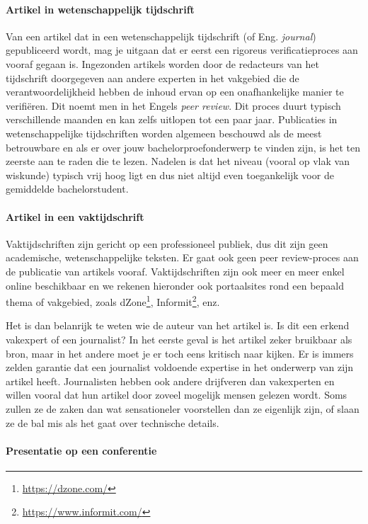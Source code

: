 \paragraph{Artikel in wetenschappelijk tijdschrift}

Van een artikel dat in een wetenschappelijk tijdschrift (of Eng. \emph{journal}) gepubliceerd wordt, mag je uitgaan dat er eerst een rigoreus verificatieproces aan vooraf gegaan is. Ingezonden artikels worden door de redacteurs van het tijdschrift doorgegeven aan andere experten in het vakgebied die de verantwoordelijkheid hebben de inhoud ervan op een onafhankelijke manier te verifiëren. Dit noemt men in het Engels \emph{peer review}. Dit proces duurt typisch verschillende maanden en kan zelfs uitlopen tot een paar jaar. Publicaties in wetenschappelijke tijdschriften worden algemeen beschouwd als de meest betrouwbare en als er over jouw bachelorproefonderwerp te vinden zijn, is het ten zeerste aan te raden die te lezen. Nadelen is dat het niveau (vooral op vlak van wiskunde) typisch vrij hoog ligt en dus niet altijd even toegankelijk voor de gemiddelde bachelorstudent.

\paragraph{Artikel in een vaktijdschrift}

Vaktijdschriften zijn gericht op een professioneel publiek, dus dit zijn geen academische, wetenschappelijke teksten. Er gaat ook geen peer review-proces aan de publicatie van artikels vooraf. Vaktijdschriften zijn ook meer en meer enkel online beschikbaar en we rekenen hieronder ook portaalsites rond een bepaald thema of vakgebied, zoals dZone\footnote{\url{https://dzone.com/}}, Informit\footnote{\url{https://www.informit.com/}}, enz.

Het is dan belanrijk te weten wie de auteur van het artikel is. Is dit een erkend vakexpert of een journalist? In het eerste geval is het artikel zeker bruikbaar als bron, maar in het andere moet je er toch eens kritisch naar kijken. Er is immers zelden garantie dat een journalist voldoende expertise in het onderwerp van zijn artikel heeft. Journalisten hebben ook andere drijfveren dan vakexperten en willen vooral dat hun artikel door zoveel mogelijk mensen gelezen wordt. Soms zullen ze de zaken dan wat sensationeler voorstellen dan ze eigenlijk zijn, of slaan ze de bal mis als het gaat over technische details.

\paragraph{Presentatie op een conferentie}

